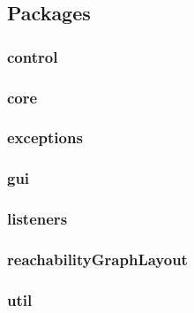 \documentclass[10pt, a4paper]{article}
\begin{document}
\subsection{Packages}

\subsubsection{control}

\subsubsection{core}
\subsubsection{exceptions}
\subsubsection{gui}
\subsubsection{listeners}
\subsubsection{reachabilityGraphLayout}
\label{label:package:layout}
\subsubsection{util}


\newpage









 
%

%
\end{document}
